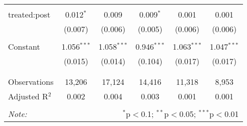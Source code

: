 \begin{table}[!htbp]
\begin{tabular}{@{\extracolsep{0pt}}lccccc}
  & & & & & \\ 
 treated:post & 0.012$^{*}$ & 0.009 & 0.009$^{*}$ & 0.001 & 0.001 \\ 
  & (0.007) & (0.006) & (0.005) & (0.006) & (0.006) \\ 
  & & & & & \\ 
 Constant & 1.056$^{***}$ & 1.058$^{***}$ & 0.946$^{***}$ & 1.063$^{***}$ & 1.047$^{***}$ \\ 
  & (0.015) & (0.014) & (0.104) & (0.017) & (0.017) \\ 
  & & & & & \\ 
\hline \\[-1.8ex] 
Observations & 13,206 & 17,124 & 14,416 & 11,318 & 8,953 \\ 
Adjusted R$^{2}$ & 0.002 & 0.004 & 0.003 & 0.001 & 0.001 \\ 
\hline 
\hline \\[-1.8ex] 
\textit{Note:}  & \multicolumn{5}{r}{$^{*}$p$<$0.1; $^{**}$p$<$0.05; $^{***}$p$<$0.01} \\ 
\end{tabular} 
\end{table} 
